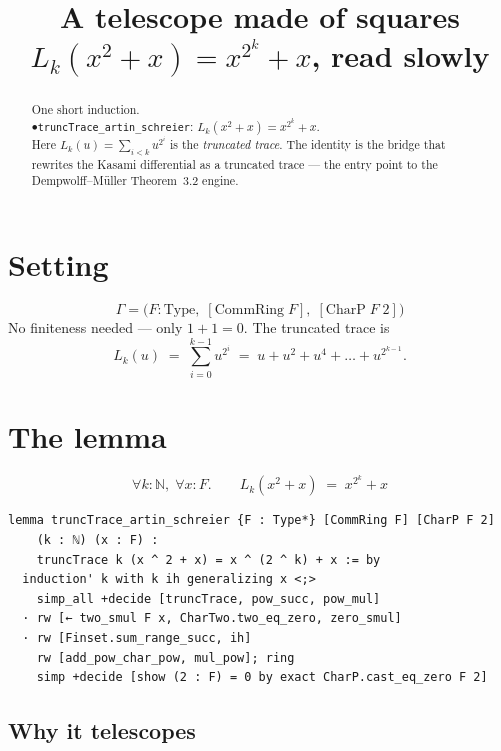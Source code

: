 \documentclass[11pt]{article}
\title{\textbf{A telescope made of squares}\\[4pt]
\large $L_k(x^2+x)=x^{2^k}+x$, read slowly}
\author{}
\date{}
\begin{document}
\maketitle

\begin{abstract}
\noindent
One short induction.\\[2pt]
$\bullet$\quad \texttt{truncTrace\_artin\_schreier}:\;\;
$L_k(x^2+x)=x^{2^k}+x$.\\[6pt]
\noindent
Here $L_k(u)=\sum_{i<k}u^{2^i}$ is the \emph{truncated trace}. The identity is the
bridge that rewrites the Kasami differential as a truncated trace --- the entry
point to the Dempwolff--M\"uller Theorem~3.2 engine.
\end{abstract}

\bigskip

\section*{Setting}

\[
\Gamma=\bigl(F:\mathrm{Type},\;[\mathrm{CommRing}\;F],\;[\mathrm{CharP}\;F\;2]\bigr)
\]
No finiteness needed --- only $1+1=0$. The truncated trace is
\[
L_k(u)\;=\;\sum_{i=0}^{k-1} u^{2^i}
\;=\; u + u^2 + u^4 + \dots + u^{2^{k-1}} .
\]

\bigskip

\section{The lemma}

\[
\forall k:\mathbb{N},\;\forall x:F.\qquad
L_k(x^2+x) \;=\; x^{2^k}+x
\]

\begin{lstlisting}
lemma truncTrace_artin_schreier {F : Type*} [CommRing F] [CharP F 2]
    (k : ℕ) (x : F) :
    truncTrace k (x ^ 2 + x) = x ^ (2 ^ k) + x := by
  induction' k with k ih generalizing x <;>
    simp_all +decide [truncTrace, pow_succ, pow_mul]
  · rw [← two_smul F x, CharTwo.two_eq_zero, zero_smul]
  · rw [Finset.sum_range_succ, ih]
    rw [add_pow_char_pow, mul_pow]; ring
    simp +decide [show (2 : F) = 0 by exact CharP.cast_eq_zero F 2]
\end{lstlisting}

\bigskip
\subsection*{Why it telescopes}
\end{document}
